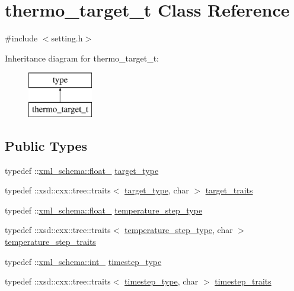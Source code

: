 \hypertarget{classthermo__target__t}{}\section{thermo\+\_\+target\+\_\+t Class Reference}
\label{classthermo__target__t}


{\ttfamily \#include $<$setting.\+h$>$}

Inheritance diagram for thermo\+\_\+target\+\_\+t\+:\begin{figure}[H]
\begin{center}
\leavevmode
\includegraphics[height=2.000000cm]{classthermo__target__t}
\end{center}
\end{figure}
\subsection*{Public Types}
\begin{DoxyCompactItemize}
\item 
typedef \+::\hyperlink{namespacexml__schema_ad7e04ab17bba0b3fdde43fb79ef6ed87}{xml\+\_\+schema\+::float\+\_\+} \hyperlink{classthermo__target__t_af968c613cbe6e33fcd41b038cefe1f0a}{target\+\_\+type}
\item 
typedef \+::xsd\+::cxx\+::tree\+::traits$<$ \hyperlink{classthermo__target__t_af968c613cbe6e33fcd41b038cefe1f0a}{target\+\_\+type}, char $>$ \hyperlink{classthermo__target__t_a560deecfd869cf48273f19845ab11324}{target\+\_\+traits}
\item 
typedef \+::\hyperlink{namespacexml__schema_ad7e04ab17bba0b3fdde43fb79ef6ed87}{xml\+\_\+schema\+::float\+\_\+} \hyperlink{classthermo__target__t_a55faae5a0c7af8d0e9567600150603b3}{temperature\+\_\+step\+\_\+type}
\item 
typedef \+::xsd\+::cxx\+::tree\+::traits$<$ \hyperlink{classthermo__target__t_a55faae5a0c7af8d0e9567600150603b3}{temperature\+\_\+step\+\_\+type}, char $>$ \hyperlink{classthermo__target__t_a16f117780a400d02f2d96858f362f52a}{temperature\+\_\+step\+\_\+traits}
\item 
typedef \+::\hyperlink{namespacexml__schema_acfa24ac68e1a188e7f44c36f7a158bf4}{xml\+\_\+schema\+::int\+\_\+} \hyperlink{classthermo__target__t_a37e1805b2e121c0e0b0a97b2f5d1dfcb}{timestep\+\_\+type}
\item 
typedef \+::xsd\+::cxx\+::tree\+::traits$<$ \hyperlink{classthermo__target__t_a37e1805b2e121c0e0b0a97b2f5d1dfcb}{timestep\+\_\+type}, char $>$ \hyperlink{classthermo__target__t_a1c37c54b22da31cd1b012efafd0f7d6d}{timestep\+\_\+traits}
\end{DoxyCompactItemize}

